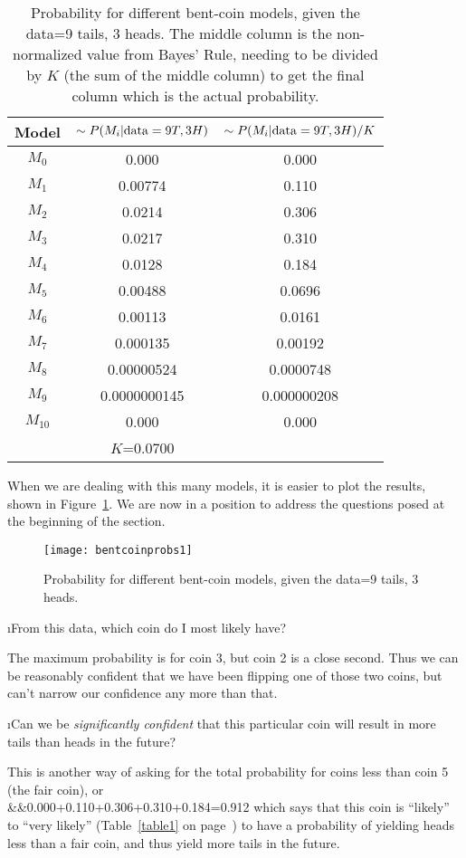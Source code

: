 \ee

\begin{table}
\begin{tabular}{ccc}
Model & $\sim P(M_i|{\rm data}=9T,3H)$ & $\sim P(M_i|{\rm data}=9T,3H)/K$ \\\hline\hline
$M_{0}$ & 0.000 & 0.000\\
$M_{1}$ & 0.00774 & 0.110\\
$M_{2}$ & 0.0214 & 0.306\\
$M_{3}$ & 0.0217 & 0.310\\
$M_{4}$ & 0.0128 & 0.184\\
$M_{5}$ & 0.00488 & 0.0696\\
$M_{6}$ & 0.00113 & 0.0161\\
$M_{7}$ & 0.000135 & 0.00192\\
$M_{8}$ & 0.00000524 & 0.0000748\\
$M_{9}$ & 0.0000000145 & 0.000000208\\
$M_{10}$ & 0.000 & 0.000\\
\cline{2-2}&$K$=0.0700 & 
\end{tabular}
\label{tbl:bentcoinprobs}
\caption{Probability for different bent-coin models, given the data={9 tails, 3 heads}.  The middle column is the non-normalized value from Bayes' Rule, needing to be divided by $K$ (the sum of the middle column) to get the final column which is the actual probability.}
\end{table}

When we are dealing with this many models, it is easier to plot the results, shown in Figure~\ref{fig:bentcoinprobs}.  We are now in a position to address the questions posed at the beginning of the section.

\begin{figure}
\texttt{[image: bentcoinprobs1]}
\label{fig:bentcoinprobs}
\caption{Probability for different bent-coin models, given the data={9 tails, 3 heads}.}
\end{figure}
\be
\i From this data, which coin do I most likely have? 

The maximum probability is for coin 3, but coin 2 is a close second.  Thus we can be reasonably confident that we have been flipping one of those two coins, but can't narrow our confidence any more than that.

\i  Can we be {\em significantly confident} that this particular coin will result in more tails than heads in the future?

This is another way of asking for the total probability for coins less than coin 5 (the fair coin), or
\beqn
{}\\
&&0.000+0.110+0.306+0.310+0.184=0.912
\eeqn
which says that this coin is ``likely'' to ``very likely'' (Table~\ref{table1} on page~\pageref{table1}) to have a probability of yielding heads less than a fair coin, and thus yield more tails in the future.
\ee



